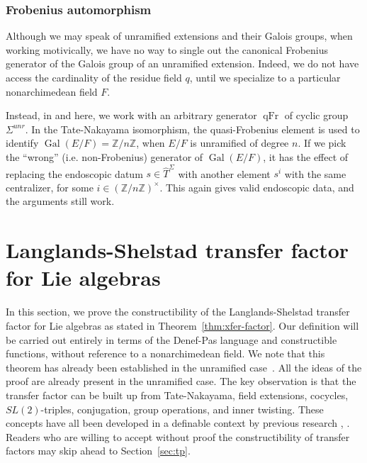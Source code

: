 \documentclass[12pt]{amsart}
\newcommand{\op}[1]{\operatorname{#1}}
\newcommand{\ring}[1]{{\mathbb #1}}
\theoremstyle{plain}
\theoremstyle{definition}
\begin{document}
\subsubsection{Frobenius automorphism}

Although we may speak of unramified extensions and their Galois
groups, when working motivically, we have no way to single out the
canonical Frobenius generator of the Galois group of an unramified
extension.  Indeed, we do not have access the cardinality of the
residue field $q$, until we specialize to a particular nonarchimedean field
$F$.

Instead, in \cite{CHL} and here, we work with an arbitrary generator
$\op{qFr}$ of cyclic group $\Sigma^{unr}$.  In the Tate-Nakayama
isomorphism, the quasi-Frobenius element is used to identify
$\op{Gal}(E/F) = \ring{Z}/n\ring{Z}$, when $E/F$ is unramified of
degree $n$.  If we pick the ``wrong'' (i.e. non-Frobenius) generator
of $\op{Gal}(E/F)$, it has the effect of replacing the endoscopic
datum $s\in \hat T^\Sigma$ with another element $s^i$ with the same
centralizer, for some $i\in (\ring{Z}/n\ring{Z})^\times$.  This again
gives valid endoscopic data, and the arguments still work.


\section{Langlands-Shelstad transfer factor for Lie algebras}
\label{sec:lsxfer}

In this section, we prove the constructibility of the
Langlands-Shelstad transfer factor for Lie algebras as stated in
Theorem~\ref{thm:xfer-factor}.  Our definition will be carried out
entirely in terms of the Denef-Pas language and constructible
functions, without reference to a nonarchimedean field.  We note that
this theorem has already been established in the unramified
case~\cite{CHL}.  All the ideas of the proof are already present in
the unramified case.  The key observation is that the transfer factor
can be built up from Tate-Nakayama, field extensions, cocycles,
$SL(2)$-triples, conjugation, group operations, and inner twisting.
These concepts have all been developed in a definable context by
previous research \cite{CHL}, \cite{CGH}.  Readers who are willing to
accept without proof the constructibility of transfer factors may skip
ahead to Section~\ref{sec:tp}.
\end{document}
